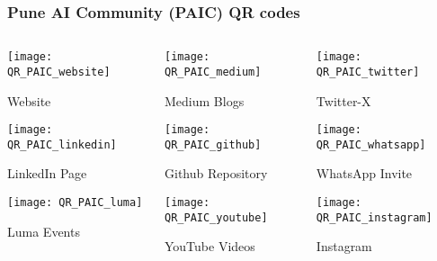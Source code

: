 \begin{frame}[fragile]\frametitle{Pune AI Community (PAIC) QR codes}
\begin{columns}
    \begin{column}[T]{0.3\linewidth}
	 
		\begin{center}
		
		\texttt{[image: QR\_PAIC\_website]}
		
				{\tiny Website} %
				
		\texttt{[image: QR\_PAIC\_linkedin]}
		
				{\tiny LinkedIn Page} %
				
		\texttt{[image: QR\_PAIC\_luma]}
		
				{\tiny Luma Events} %
				
		\end{center}		
    \end{column}
    \begin{column}[T]{0.3\linewidth}
		\begin{center}
		
			
		\texttt{[image: QR\_PAIC\_medium]}
		
				{\tiny Medium Blogs}	 %
				
		\texttt{[image: QR\_PAIC\_github]}
		
				{\tiny Github Repository}	 %
						
		\texttt{[image: QR\_PAIC\_youtube]}
		
				{\tiny YouTube Videos}	 %


		\end{center}	
    \end{column}	
    \begin{column}[T]{0.3\linewidth}
	
				
		\begin{center}

		\texttt{[image: QR\_PAIC\_twitter]}
		
				{\tiny Twitter-X} %
						
		\texttt{[image: QR\_PAIC\_whatsapp]}
		
				{\tiny WhatsApp Invite}	 %

		\texttt{[image: QR\_PAIC\_instagram]}
		
				{\tiny Instagram}	 %
		\end{center}	
    \end{column}
  \end{columns}
\end{frame}